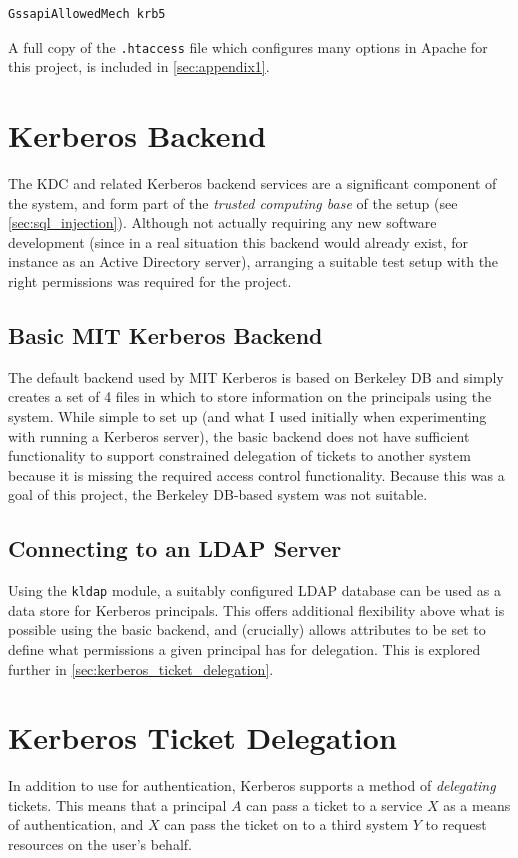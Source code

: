 \documentclass[12pt]{report}
\begin{document}
\begin{verbatim}
GssapiAllowedMech krb5
\end{verbatim}

A full copy of the \verb+.htaccess+ file which configures many options in Apache for this project, is included in \autoref{sec:appendix1}.

\section{Kerberos Backend}
\label{sec:kerberos_backend}
The KDC and related Kerberos backend services are a significant component of the system, and form part of the \textit{trusted computing base} of the setup (see \autoref{sec:sql_injection}). Although not actually requiring any new software development (since in a real situation this backend would already exist, for instance as an Active Directory server), arranging a suitable test setup with the right permissions was required for the project.

\subsection{Basic MIT Kerberos Backend}
The default backend used by MIT Kerberos is based on Berkeley DB and simply creates a set of 4 files in which to store information on the principals using the system\cite{KDC-database-docs}. While simple to set up (and what I used initially when experimenting with running a Kerberos server), the basic backend does not have sufficient functionality to support constrained delegation of tickets to another system because it is missing the required access control functionality\cite{KRB-DELEG}. Because this was a goal of this project, the Berkeley DB-based system was not suitable.

\subsection{Connecting to an LDAP Server}
Using the \texttt{kldap} module, a suitably configured LDAP database can be used as a data store for Kerberos principals. This offers additional flexibility above what is possible using the basic backend, and (crucially) allows attributes to be set to define what permissions a given principal has for delegation. This is explored further in \autoref{sec:kerberos_ticket_delegation}.

\section{Kerberos Ticket Delegation}
\label{sec:kerberos_ticket_delegation}
In addition to use for authentication, Kerberos supports a method of \textit{delegating} tickets. This means that a principal $A$ can pass a ticket to a service $X$ as a means of authentication, and $X$ can pass the ticket on to a third system $Y$ to request resources on the user's behalf.
\end{document}
